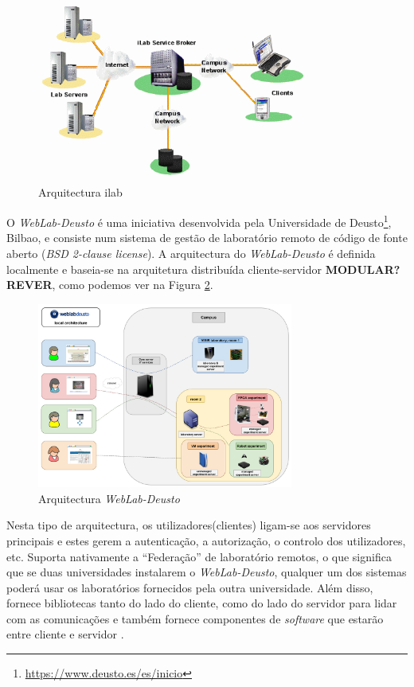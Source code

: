 \begin{figure}[hbtp]
    \centering
    \includegraphics[width=0.8\textwidth]{figures/isa_architecture.png}
    \caption{Arquitectura \acrshort{ilab}\cite{arquitecturaisa}}
    \label{fig:arquitecturaisa}
\end{figure}

O \textit{WebLab-Deusto} é uma iniciativa desenvolvida pela Universidade de Deusto\footnote{\url{https://www.deusto.es/es/inicio}}, Bilbao, e consiste num sistema de gestão de \acrshort{laboratório remoto} de código de fonte aberto (\textit{BSD 2-clause license}). A arquitectura do \textit{WebLab-Deusto} é definida localmente e baseia-se na arquitetura distribuída cliente-servidor \textbf{MODULAR? REVER}, como podemos ver na Figura \ref{fig:arquitecturawld}.

\begin{figure}[hbtp]
    \centering
    \includegraphics[width=0.75\textwidth]{figures/local_architecture.png}
    \caption{Arquitectura \textit{WebLab-Deusto}}
    \label{fig:arquitecturawld}
\end{figure}

Nesta tipo de arquitectura, os utilizadores(clientes) ligam-se aos servidores principais e estes gerem a autenticação, a autorização, o controlo dos utilizadores, etc. 
Suporta nativamente a ``Federação'' de \acrshort{laboratório remoto}s, o que significa que se duas universidades instalarem o \textit{WebLab-Deusto}, qualquer um dos sistemas poderá usar os laboratórios fornecidos pela outra universidade.
Além disso, fornece bibliotecas tanto do lado do cliente, como do lado do servidor para lidar com as comunicações e também fornece componentes de \textit{software} que estarão entre cliente e servidor \cite{wlddoc}.

